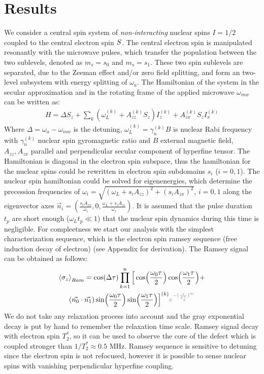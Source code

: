 \documentclass[%
 reprint,
superscriptaddress,
 amsmath,amssymb,
 aps,
]{revtex4-2}
\begin{document}
\section{Results}
\label{sec:theory}
We consider a central spin system of \textit{non-interacting} nuclear spins $I=1/2$ coupled to the central electron spin $\boldmath{S}$. 
The central electron spin is manipulated resonantly with the microwave pulses, which transfer the population between the two sublevels, denoted as $m_s=s_0$ and $m_s = s_1$. 
These two spin sublevels are separated, due to the Zeeman effect and/or zero field splitting, and form an two-level subsystem with energy splitting of $\omega_a$. 
The Hamiltonian of the system in the secular approximation and in the rotating frame of the applied microwave $\omega_{mw}$ can be written as:
\begin{align}
	H = \Delta S_z + \sum_k (\omega_L^{(k)}  + A_{zz}^{(k)} S_z) I_z^{(k)} + A_{zx}^{(k)} S_z I_x^{(k)}
	\label{eq:H}
\end{align}
Where $\Delta = \omega_a - \omega_{mw}$ is the detuning, $\omega_L^{(k)} =\gamma_n^{(k)} B$ is nuclear Rabi frequency with $\gamma_n^{(k)}$ nuclear spin gyromagnetic ratio and $B$ external magnetic field, $A_{zz}, A_{zx}$ parallel and perpendicular secular component of hyperfine tensor. The Hamiltonian is diagonal in the electron spin subspace, thus the hamiltonian for the nuclear spins could be rewritten in electron spin subdomains $s_i$ ($i=0,1$). The nuclear spin hamiltonian could be solved for eigenenergies, which determine the precession frequencies of $\omega_i = \sqrt{(\omega_L + s_i A_{zz})^2+ (s_i A_{zx})^2}$, $i=0,1$ along the eigenvector axes $\vec{n}_i =(\frac{s_i A_{zx}}{\omega_i}, 0, \frac{\omega_L + s_i A_{zz}} {\omega_i})$. It is assumed that the pulse duration $t_p$ are short enough ($\omega_L t_p \ll 1$) that the nuclear spin dynamics during this time is negligible. 
For compleetness we start our analysis with the simplest characterization sequence, which is the electron spin ramsey sequence (free induction decay of electron) (see Appendix for derivation).
The Ramsey signal can be obtained as follows:
\begin{gather}
	\expval{\sigma_z}_{Ram} = \cos(\Delta \tau) \prod_{k=1}^{n} \Big[ \cos(\frac{\omega_0 \tau}{2}) \cos(\frac{\omega_1 \tau}{2})+ \notag \\
	(\vec{n_0}\cdot \vec{n_1})\sin(\frac{\omega_0 \tau}{2}) \sin(\frac{\omega_1 \tau}{2}) \Big]^{(k)}
	\textcolor{gray}{e^{-(\frac{\tau}{T_2^\ast})^m}}
\end{gather} 
We do not take any relaxation process into account and the gray exponential decay is put by hand to remember the relaxation time scale. Ramsey signal decay with electron spin $T_2^\ast$, so it can be used to observe the core of the defect which is coupled stronger than $1/T_2^\ast \approx 0.5$ MHz. Ramsey sequence is sensitive to detuning since the electron spin is not refocused, however it is possible to sense nuclear spins with vanishing perpendicular hyperfine coupling.\\
\end{document}
